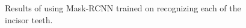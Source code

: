 \documentclass[a4paper]{article}
\begin{document}
\begin{figure}
    \qquad
    \caption{Results of using Mask-RCNN\cite{MASK-RCNN} trained on recognizing each of the incisor teeth.}
  \label{fig:mask-rcnn-all}
\end{figure}
\newpage


\end{document}
